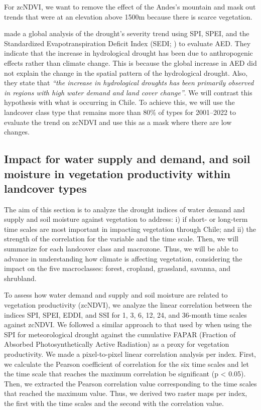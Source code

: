 \documentclass[
  authoryear,
  preprint,
  3p,
  onecolumn]{elsarticle}
\begin{document}
For zcNDVI, we want to remove the effect of the Andes's mountain and
mask out trends that were at an elevation above 1500m because there is
scarce vegetation.

\citet{Vicente-Serrano2021} made a global analysis of the drought's
severity trend using SPI, SPEI, and the Standardized Evapotranspiration
Deficit Index (SEDI; \citet{Vicente-Serrano2018}) to evaluate AED. They
indicate that the increase in hydrological drought has been due to
anthropogenic effects rather than climate change. This is because the
global increase in AED did not explain the change in the spatial pattern
of the hydrological drought. Also, they state that \emph{``the increase
in hydrological droughts has been primarily observed in regions with
high water demand and land cover change''}. We will contrast this
hypothesis with what is occurring in Chile. To achieve this, we will use
the landcover class type that remains more than 80\% of types for
2001--2022 to evaluate the trend on zcNDVI and use this as a mask where
there are low changes.

\hypertarget{impact-for-water-supply-and-demand-and-soil-moisture-in-vegetation-productivity-within-landcover-types}{%
\subsection{Impact for water supply and demand, and soil moisture in
vegetation productivity within landcover
types}\label{impact-for-water-supply-and-demand-and-soil-moisture-in-vegetation-productivity-within-landcover-types}}

The aim of this section is to analyze the drought indices of water
demand and supply and soil moisture against vegetation to address: i) if
short- or long-term time scales are most important in impacting
vegetation through Chile; and ii) the strength of the correlation for
the variable and the time scale. Then, we will summarize for each
landcover class and macrozone. Thus, we will be able to advance in
understanding how climate is affecting vegetation, considering the
impact on the five macroclasses: forest, cropland, grassland, savanna,
and shrubland.

To assess how water demand and supply and soil moisture are related to
vegetation productivity (zcNDVI), we analyze the linear correlation
between the indices SPI, SPEI, EDDI, and SSI for 1, 3, 6, 12, 24, and
36-month time scales against zcNDVI. We followed a similar approach to
that used by \citet{Meroni2016} when using the SPI for meteorological
drought against the cumulative FAPAR (Fraction of Absorbed
Photosynthetically Active Radiation) as a proxy for vegetation
productivity. We made a pixel-to-pixel linear correlation analysis per
index. First, we calculate the Pearson coefficient of correlation for
the six time scales and let the time scale that reaches the maximum
correlation be significant (p \textless{} 0.05). Then, we extracted the
Pearson correlation value corresponding to the time scales that reached
the maximum value. Thus, we derived two raster maps per index, the first
with the time scales and the second with the correlation value.
\end{document}
